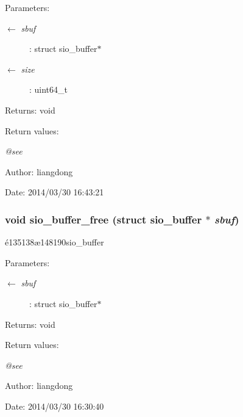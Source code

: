 \begin{Desc}
\item[Parameters:]
\begin{description}
\item[\mbox{$\leftarrow$} {\em sbuf}]: struct sio\_\-buffer$\ast$ \item[\mbox{$\leftarrow$} {\em size}]: uint64\_\-t \end{description}
\end{Desc}
\begin{Desc}
\item[Returns:]void \end{Desc}
\begin{Desc}
\item[Return values:]
\begin{description}
\item[{\em @see}]\end{description}
\end{Desc}
\begin{Desc}
\item[Author:]liangdong \end{Desc}
\begin{Desc}
\item[Date:]2014/03/30 16:43:21 \end{Desc}
\subsubsection{\setlength{\rightskip}{0pt plus 5cm}void sio\_\-buffer\_\-free (struct sio\_\-buffer $\ast$ {\em sbuf})}\label{sio__buffer_8c_a3}


\'{e}135138\ae{}148190sio\_\-buffer 

\begin{Desc}
\item[Parameters:]
\begin{description}
\item[\mbox{$\leftarrow$} {\em sbuf}]: struct sio\_\-buffer$\ast$ \end{description}
\end{Desc}
\begin{Desc}
\item[Returns:]void \end{Desc}
\begin{Desc}
\item[Return values:]
\begin{description}
\item[{\em @see}]\end{description}
\end{Desc}
\begin{Desc}
\item[Author:]liangdong \end{Desc}
\begin{Desc}
\item[Date:]2014/03/30 16:30:40 \end{Desc}
